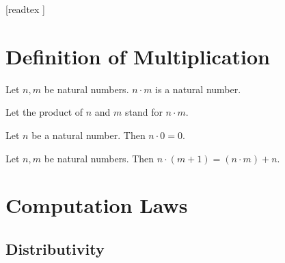 \documentclass[10pt]{article}
\begin{document}
  \begin{imports}
    \begin{forthel}
      [readtex ]
    \end{forthel}
  \end{imports}


  \section{Definition of Multiplication}

  \begin{forthel}
    \begin{signature}
      Let $n, m$ be natural numbers.
      $n \cdot m$ is a natural number.
    \end{signature}

    Let the product of $n$ and $m$ stand for $n \cdot m$.
  \end{forthel}

  \begin{forthel}
    \begin{axiom}
      Let $n$ be a natural number.
      Then $n \cdot 0 = 0$.
    \end{axiom}
  \end{forthel}

  \begin{forthel}
    \begin{axiom}
      Let $n, m$ be natural numbers.
      Then $n \cdot (m + 1) = (n \cdot m) + n$.
    \end{axiom}
  \end{forthel}


  \section{Computation Laws}

  \subsection{Distributivity}
\end{document}
